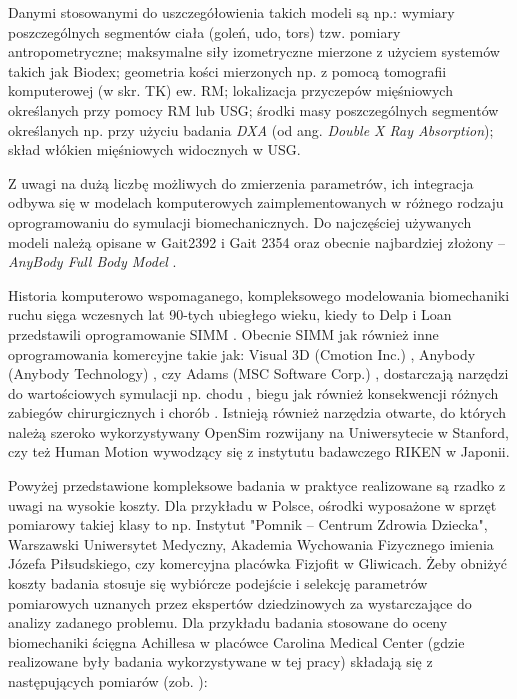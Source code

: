 Danymi stosowanymi do uszczegółowienia takich modeli są np.: wymiary poszczególnych segmentów ciała (goleń, udo, tors) tzw. pomiary antropometryczne; maksymalne siły izometryczne mierzone z użyciem systemów takich jak Biodex; geometria kości mierzonych np. z pomocą tomografii komputerowej (w skr. TK) ew. RM; lokalizacja przyczepów mięśniowych określanych przy pomocy RM lub USG; środki masy poszczególnych segmentów określanych np. przy użyciu badania \textit{DXA} (od ang. \textit{Double X Ray Absorption}); skład włókien mięśniowych widocznych w USG.

Z uwagi na dużą liczbę możliwych do zmierzenia parametrów, ich integracja odbywa się w modelach komputerowych zaimplementowanych w różnego rodzaju oprogramowaniu do symulacji biomechanicznych. Do najczęściej używanych modeli należą opisane w \cite{John2013} Gait2392 i Gait 2354 oraz obecnie najbardziej złożony -- \textit{AnyBody Full Body Model} \cite{Bassani2017}. 

Historia komputerowo wspomaganego, kompleksowego modelowania biomechaniki ruchu sięga wczesnych lat 90-tych ubiegłego wieku, kiedy to Delp i Loan przedstawili oprogramowanie SIMM \cite{Delp1990}. Obecnie SIMM jak również inne oprogramowania komercyjne takie jak: Visual 3D (Cmotion Inc.) \cite{Visual3D}, Anybody (Anybody Technology) \cite{AnyBody}, czy Adams (MSC Software Corp.) \cite{Adams}, dostarczają narzędzi do wartościowych symulacji np. chodu \cite{Steele2010}, biegu \cite{Hamner2010} jak również konsekwencji różnych zabiegów chirurgicznych \cite{Gomes2013} i chorób \cite{Shao2009}. Istnieją również narzędzia otwarte, do których należą szeroko wykorzystywany OpenSim \cite{Delp2007} rozwijany na Uniwersytecie w Stanford, czy też Human Motion \cite{Riken} wywodzący się z instytutu badawczego RIKEN w Japonii.

Powyżej przedstawione kompleksowe badania w praktyce realizowane są rzadko z uwagi na wysokie koszty. Dla przykładu w Polsce, ośrodki wyposażone w sprzęt pomiarowy takiej klasy to np. Instytut "Pomnik – Centrum Zdrowia Dziecka", Warszawski Uniwersytet Medyczny, Akademia Wychowania Fizycznego imienia Józefa Piłsudskiego, czy komercyjna placówka Fizjofit w Gliwicach. Żeby obniżyć koszty badania stosuje się wybiórcze podejście i selekcję parametrów pomiarowych uznanych przez ekspertów dziedzinowych za wystarczające do analizy zadanego problemu. Dla przykładu badania stosowane do oceny biomechaniki ścięgna Achillesa w placówce Carolina Medical Center (gdzie realizowane były badania wykorzystywane w tej pracy) składają się z następujących pomiarów (zob. \cite{CMC}):

